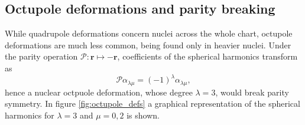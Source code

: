 \subsection{Octupole deformations and parity breaking}
While quadrupole deformations concern nuclei across the whole chart, octupole deformations are much less common, being found only in heavier nuclei.
Under the parity operation $\mathcal P: \bm r \mapsto -\bm r$, coefficients of the spherical harmonics transform as
\begin{equation}
    \mathcal P \alpha_{\lambda \mu} = (-1)^{\lambda} \alpha_{\lambda \mu},
\end{equation}
hence a nuclear octpuole deformation, whose degree $\lambda=3$, would break parity symmetry. In figure \ref{fig:octupole_defs} a graphical representation of the spherical harmonics for $\lambda=3$ and $\mu=0,2$ is shown.
